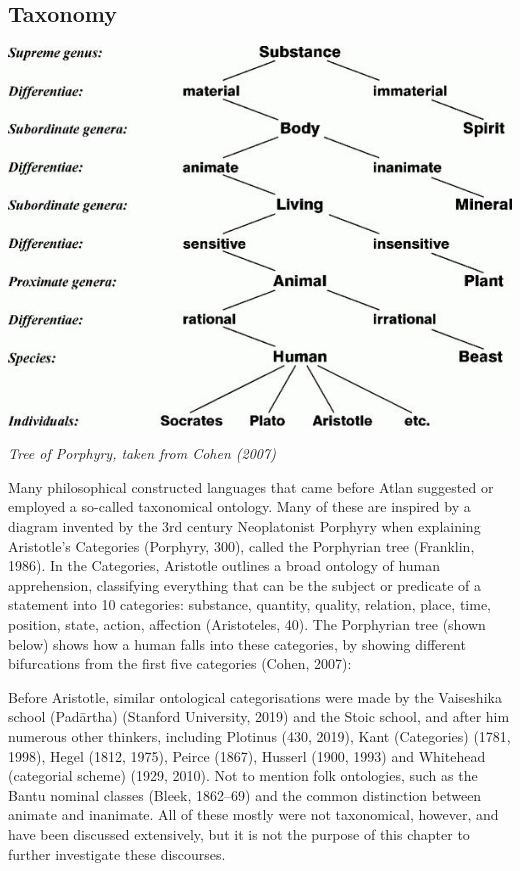 \subsection{Taxonomy}

\vspace{0.3cm}
\begin{center}
\includegraphics[scale=0.5]{./Images/tree.jpeg}

{\footnotesize \it Tree of Porphyry, taken from Cohen (2007)}
\end{center}

\noindent Many philosophical constructed languages that came before Atlan suggested or employed a so-called taxonomical ontology. Many of these are inspired by a diagram invented by the 3rd century Neoplatonist Porphyry when explaining Aristotle’s Categories (Porphyry, 300), called the Porphyrian tree (Franklin, 1986). In the Categories, Aristotle outlines a broad ontology of human apprehension, classifying everything that can be the subject or predicate of a statement into 10 categories: substance, quantity, quality, relation, place, time, position, state, action, affection (Aristoteles, 40). The Porphyrian tree (shown below) shows how a human falls into these categories, by showing different bifurcations from the first five categories (Cohen, 2007): 

Before Aristotle, similar ontological categorisations were made by the Vaiseshika school (Padārtha) (Stanford University, 2019) and the Stoic school, and after him numerous other thinkers, including Plotinus (430, 2019), Kant (Categories) (1781, 1998), Hegel  (1812, 1975), Peirce (1867), Husserl (1900, 1993) and Whitehead (categorial scheme) (1929, 2010). Not to mention folk ontologies, such as the Bantu nominal classes (Bleek, 1862–69) and the common distinction between animate and inanimate. All of these mostly were not taxonomical, however, and have been discussed extensively, but it is not the purpose of this chapter to further investigate these discourses.  

